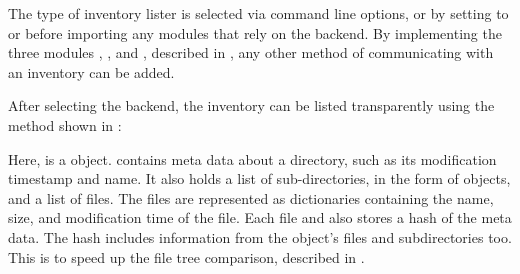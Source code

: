 The type of inventory lister is selected via command line options,
or by setting  to  or  before importing any modules that rely on the backend.
By implementing the three modules , , and , described in {\hyperref[\detokenize{backend:backend-ref}]{}},
any other method of communicating with an inventory can be added.

After selecting the backend, the inventory can be listed transparently using the method shown in {\hyperref[\detokenize{intro:intro-ref}]{}}:

\begin{sphinxVerbatim}[commandchars=\\\{\}]
   

  
\end{sphinxVerbatim}

Here,  is a {\hyperref[\detokenize{reference:dynamo_consistency.datatypes.DirectoryInfo}]{}} object.
 contains meta data about a directory, such as its modification timestamp and name.
It also holds a list of sub-directories, in the form of  objects, and a list of files.
The files are represented as dictionaries containing the name, size, and modification time of the file.
Each file and  also stores a hash of the meta data.
The  hash includes information from the object’s files and subdirectories too.
This is to speed up the file tree comparison, described in {\hyperref[\detokenize{compare:compare-algo-ref}]{}}.


